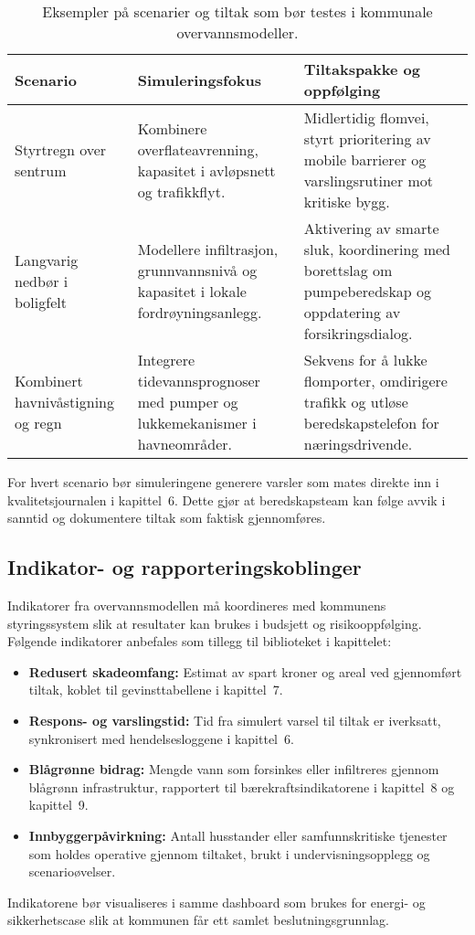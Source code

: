 \begin{table}[htbp]
    \centering
    \begin{tabular}{p{}p{}p{}}
        \toprule
        \textbf{Scenario} & \textbf{Simuleringsfokus} & \textbf{Tiltakspakke og oppfølging}\\
        \midrule
        Styrtregn over sentrum & Kombinere overflateavrenning, kapasitet i avløpsnett og trafikkflyt. & Midlertidig flomvei, styrt prioritering av mobile barrierer og varslingsrutiner mot kritiske bygg.\\
        \addlinespace
        Langvarig nedbør i boligfelt & Modellere infiltrasjon, grunnvannsnivå og kapasitet i lokale fordrøyningsanlegg. & Aktivering av smarte sluk, koordinering med borettslag om pumpeberedskap og oppdatering av forsikringsdialog.\\
        \addlinespace
        Kombinert havnivåstigning og regn & Integrere tidevannsprognoser med pumper og lukkemekanismer i havneområder. & Sekvens for å lukke flomporter, omdirigere trafikk og utløse beredskapstelefon for næringsdrivende.\\
        \bottomrule
    \end{tabular}
    \caption{Eksempler på scenarier og tiltak som bør testes i kommunale overvannsmodeller.}
    \label{tab:kap04-overvann-tiltak}
\end{table}

For hvert scenario bør simuleringene generere varsler som mates direkte inn i kvalitetsjournalen i kapittel~6. Dette gjør at beredskapsteam kan følge avvik i sanntid og dokumentere tiltak som faktisk gjennomføres.

\subsection{Indikator- og rapporteringskoblinger}
Indikatorer fra overvannsmodellen må koordineres med kommunens styringssystem slik at resultater kan brukes i budsjett og risikooppfølging. Følgende indikatorer anbefales som tillegg til biblioteket i kapittelet:
\begin{itemize}
    \item \textbf{Redusert skadeomfang:} Estimat av spart kroner og areal ved gjennomført tiltak, koblet til gevinsttabellene i kapittel~7.
    \item \textbf{Respons- og varslingstid:} Tid fra simulert varsel til tiltak er iverksatt, synkronisert med hendelsesloggene i kapittel~6.
    \item \textbf{Blågrønne bidrag:} Mengde vann som forsinkes eller infiltreres gjennom blågrønn infrastruktur, rapportert til bærekraftsindikatorene i kapittel~8 og kapittel~9.
    \item \textbf{Innbyggerpåvirkning:} Antall husstander eller samfunnskritiske tjenester som holdes operative gjennom tiltaket, brukt i undervisningsopplegg og scenarioøvelser. 
\end{itemize}
Indikatorene bør visualiseres i samme dashboard som brukes for energi- og sikkerhetscase slik at kommunen får ett samlet beslutningsgrunnlag.

